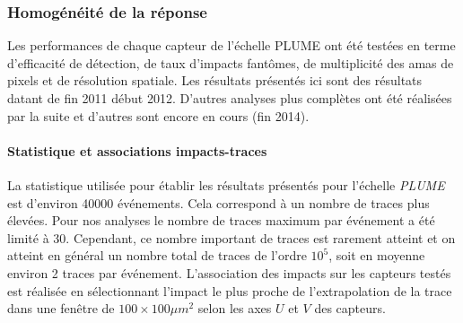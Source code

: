    \subsubsection{Homog\'en\'eit\'e de la r\'eponse}

   Les performances de chaque capteur de l'\'echelle PLUME ont \'et\'e test\'ees en terme d'efficacit\'e de d\'etection, de taux d'impacts fant\^omes, de multiplicit\'e des amas de pixels et de r\'esolution spatiale. Les r\'esultats pr\'esent\'es ici sont des r\'esultats datant de fin 2011 début 2012. D'autres analyses plus compl\`etes ont \'et\'e r\'ealis\'ees par la suite et d'autres sont encore en cours (fin 2014).
   
   
   
%    
%    
%    

%    
   
   
   \paragraph{Statistique et associations impacts-traces}
 
   La statistique utilis\'ee pour \'etablir les r\'esultats pr\'esent\'es pour l'\'echelle \textit{PLUME} est d'environ 40000 \'ev\'enements. Cela correspond \`a un nombre de traces plus \'elev\'ees. Pour nos analyses le nombre de traces maximum par \'ev\'enement a \'et\'e limit\'e \`a 30. Cependant, ce nombre important de traces est rarement atteint et on atteint en g\'en\'eral un nombre total de traces de l'ordre $10^5$, soit en moyenne environ 2 traces par \'ev\'enement. L'association des impacts sur les capteurs test\'es est r\'ealis\'ee en s\'electionnant l'impact le plus proche de l'extrapolation de la trace dans une fen\^etre de $100 \times 100 \mu m^2$ selon les axes $U$ et $V$ des capteurs.
   
